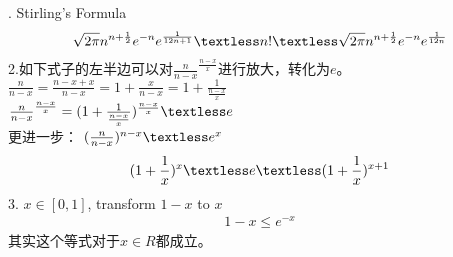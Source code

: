 . Stirling's Formula
\begin{align}
    \nonumber \sqrt{2\pi}n^{n+\frac{1}{2}}e^{-n}e^{\frac{1}{12n+1}}\textless n! \textless \sqrt{2\pi}n^{n+\frac{1}{2}}e^{-n}e^{\frac{1}{12n}} 
\end{align}
2.如下式子的左半边可以对$\frac{n}{n-x}^{\frac{n-x}{x}}$进行放大，转化为$e$。\\
$\frac{n}{n-x}=\frac{n-x+x}{n-x}=1+\frac{x}{n-x}=1+\frac{1}{\frac{n-x}{x}}$\\
$\frac{n}{n-x}^{\frac{n-x}{x}}=(1+\frac{1}{\frac{n-x}{x}})^{\frac{n-x}{x}} \textless e$\\
更进一步： $(\frac{n}{n-x})^{n-x} \textless e^{x}$
\begin{align}
    \nonumber (1+\frac{1}{x})^{x} \textless e \textless (1+\frac{1}{x})^{x+1}
\end{align}
3. $x\in[0,1]$, transform $1-x$ to $x$
\begin{align}
    \nonumber 1-x \le e^{-x}
\end{align}
其实这个等式对于$x\in R$都成立。